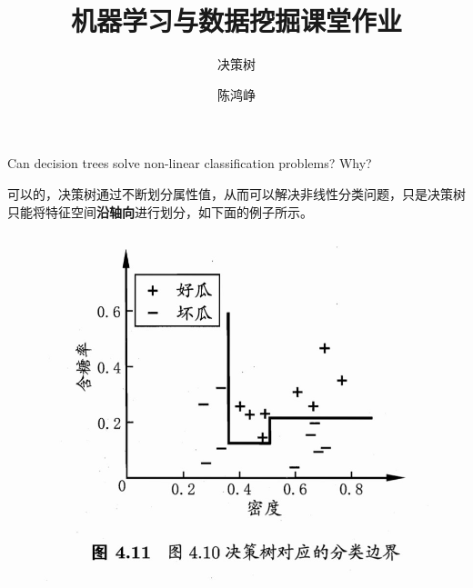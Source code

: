\documentclass[logo,reportComp]{thesis}
\title{机器学习与数据挖掘课堂作业}
\subtitle{决策树}
\author{陈鸿峥}
\begin{document}
\maketitle

\begin{question}
\normalfont Can decision trees solve non-linear classification problems? Why?
\end{question}
\begin{answer}
可以的，决策树通过不断划分属性值，从而可以解决非线性分类问题，只是决策树只能将特征空间\textbf{沿轴向}进行划分，如下面的例子所示。
\begin{figure}[H]
\centering
\includegraphics[width=0.6\linewidth]{fig/dt.jpg}
\end{figure}
\end{answer}
\end{document}
